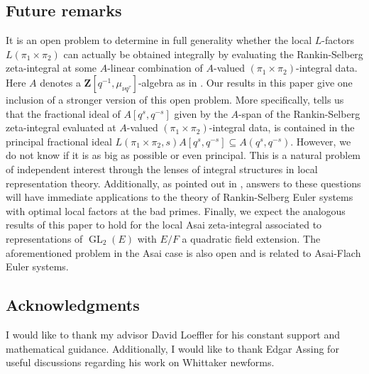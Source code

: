 \documentclass{amsart}
\theoremstyle{plain}
\theoremstyle{plain}
\theoremstyle{remark}
\DeclareMathOperator{\GL}{GL}
\begin{document}
\subsection{Future remarks} 
It is an open problem to determine in full generality whether the local $L$-factors $L(\pi_1\times\pi_2)$ can actually be obtained integrally by evaluating the Rankin-Selberg zeta-integral at some $A$-linear combination of $A$-valued $(\pi_1\times\pi_2)$-integral data. Here $A$ denotes a $\mathbf{Z}[q^{-1},\mu_{\nu q^\tau}]$-algebra as in . Our results in this paper give one inclusion of a stronger version of this open problem. More specifically,  tells us that the fractional ideal of $A[q^s,q^{-s}]$ given by the $A$-span of the Rankin-Selberg zeta-integral evaluated at $A$-valued $(\pi_1\times\pi_2)$-integral data, is contained in the principal fractional ideal $L(\pi_1\times\pi_2,s)A[q^s,q^{-s}]\subseteq A(q^s,q^{-s})$. However, we do not know if it is as big as possible or even principal. This is
a natural problem of independent interest through the lenses of integral structures in local representation
theory. Additionally, as pointed out in \cite[\S $3.4$]{loeffler2025euleradjointmodularform}, answers to these questions will have immediate applications to the theory of Rankin-Selberg Euler systems with optimal local factors at the bad primes. Finally, we expect the analogous results of this paper to hold for the local Asai zeta-integral associated to representations of $\GL_2(E)$ with $E/F$ a quadratic field extension. The aforementioned problem in the Asai case is also open and is related to Asai-Flach Euler systems.
\subsection{Acknowledgments} I would like to thank my advisor David Loeffler for his constant support
and mathematical guidance. Additionally, I would like to thank Edgar Assing for useful discussions
regarding his work on Whittaker newforms.
{
  \hypersetup{linkcolor=black}
  \setcounter{tocdepth}{2}
  \tableofcontents
}
\end{document}
